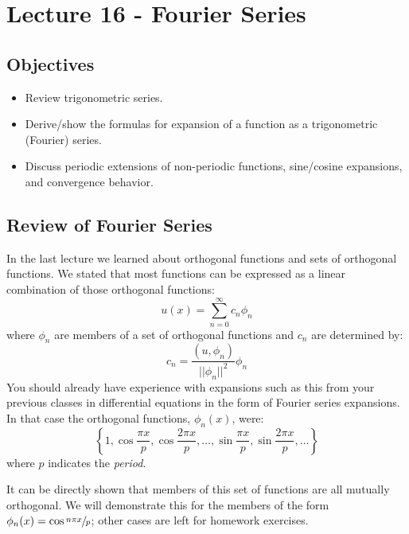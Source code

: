 \chapter{Lecture 16 - Fourier Series}
\label{ch:lec16}
\section{Objectives}
\begin{itemize}
\item Review trigonometric series.
\item Derive/show the formulas for expansion of a function as a trigonometric (Fourier) series.
\item Discuss periodic extensions of non-periodic functions, sine/cosine expansions, and convergence behavior.
\end{itemize}

\section{Review of Fourier Series}
In the last lecture we learned about orthogonal functions and sets of orthogonal functions.  We stated that most functions can be expressed as a linear combination of those orthogonal functions:
\begin{equation*}
u(x) = \sum\limits_{n=0}^{\infty} c_n \phi_n
\end{equation*}
where $\phi_n$ are members of a set of orthogonal functions and $c_n$ are determined by:
\begin{equation*}
c_n = \frac{(u,\phi_n)}{||\phi_n||^2}\phi_n
\end{equation*} 
You should already have experience with expansions such as this from your previous classes in differential equations in the form of Fourier series expansions.  In that case the orthogonal functions, $\phi_n(x)$, were:
\begin{equation*}
\left\{1,\cos{\frac{\pi x}{p}},\cos{\frac{2\pi x}{p}},\dots,\sin{\frac{\pi x}{p}}, \sin{\frac{2\pi x}{p}}, \dots \right\}
\end{equation*}
where $p$ indicates the \emph{period}. 

It can be directly shown that members of this set of functions are all mutually orthogonal.  We will demonstrate this for the members of the form $\phi_n(x) = \cos{\sfrac{n \pi x}{p}}$; other cases are left for homework exercises.

